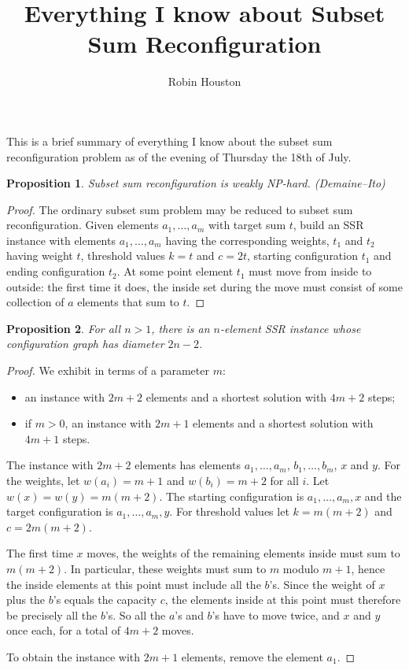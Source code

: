 \documentclass{robinminion}
\author{Robin Houston}
\title{Everything I know about Subset Sum Reconfiguration}
\newtheorem{prop}{Proposition}
\begin{document}
\maketitle
\linespread{1.1}\selectfont

\noindent This is a brief summary of everything I know about the subset sum reconfiguration problem as of the evening of Thursday the 18th of July.

\begin{prop}
    Subset sum reconfiguration is weakly NP-hard. \textup(Demaine--Ito\textup)
\end{prop}
\begin{proof}
    The ordinary subset sum problem may be reduced to subset sum reconfiguration. Given elements
    $a_1, \dots, a_m$ with target sum $t$, build an SSR instance with elements $a_1, \dots, a_m$ having the corresponding weights,
    $t_1$ and $t_2$ having weight $t$, threshold values $k=t$ and $c=2t$, starting configuration $t_1$ and ending configuration
    $t_2$. At some point element $t_1$ must move from inside to outside: the first time it does, the
    inside set during the move must consist of some collection of $a$ elements that sum to $t$.
\end{proof}

\begin{prop}\label{prop:diameter}
    For all $n>1$, there is an $n$-element SSR instance whose configuration graph has diameter $2n-2$.
\end{prop}
\begin{proof}
    We exhibit in terms of a parameter $m$:
    \begin{itemize}
        \item an instance with $2m+2$ elements and a shortest solution with $4m+2$ steps;
        \item if $m>0$, an instance with $2m+1$ elements and a shortest solution with $4m+1$ steps.
    \end{itemize}
    The instance with $2m+2$ elements has elements $a_1, \dots, a_m$, $b_1, \dots, b_m$, $x$ and $y$.
    For the weights, let $w(a_i)=m+1$ and $w(b_i)=m+2$ for all $i$. Let $w(x)=w(y)=m(m+2)$. The
    starting configuration is $a_1, \dots, a_m, x$ and the target configuration is $a_1, \dots, a_m, y$.
    For threshold values let $k=m(m+2)$ and $c=2m(m+2)$.
    
    The first time $x$ moves, the weights of the remaining elements inside must sum to $m(m+2)$.
    In particular, these weights must sum to $m$ modulo $m+1$, hence the inside elements at this
    point must include all the $b$'s. Since the weight of $x$ plus the $b$'s equals the capacity $c$,
    the elements inside at this point must therefore be precisely all the $b$'s.
    So all the $a$'s and $b$'s have to move twice, and $x$ and $y$ once each, for a total of
    $4m+2$ moves.
    
    To obtain the instance with $2m+1$ elements, remove the element $a_1$.
\end{proof}
\end{document}
